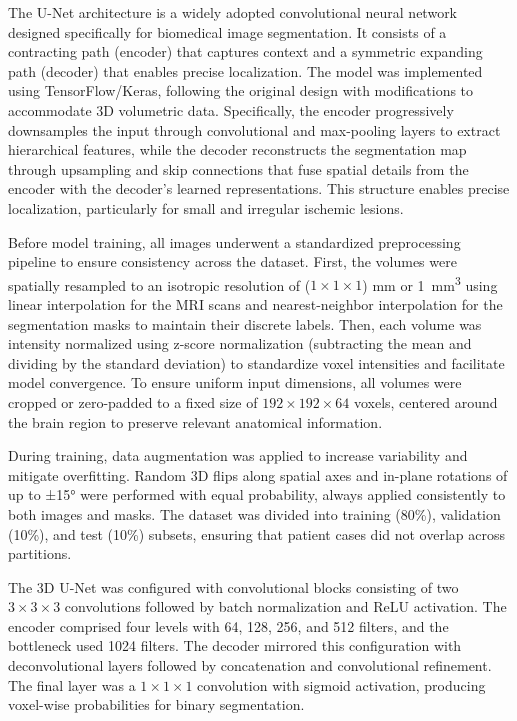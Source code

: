 \documentclass[12pt]{article}
\begin{document}
The U-Net architecture \cite{ronnebergerUNetConvolutionalNetworks2015} is a widely adopted convolutional neural network designed specifically for biomedical image segmentation. It consists of a contracting path (encoder) that captures context and a symmetric expanding path (decoder) that enables precise localization. The model was implemented using TensorFlow/Keras, following the original design with modifications to accommodate 3D volumetric data. Specifically, the encoder progressively downsamples the input through convolutional and max-pooling layers to extract hierarchical features, while the decoder reconstructs the segmentation map through upsampling and skip connections that fuse spatial details from the encoder with the decoder’s learned representations. This structure enables precise localization, particularly for small and irregular ischemic lesions.

Before model training, all images underwent a standardized preprocessing pipeline to ensure consistency across the dataset. First, the volumes were spatially resampled to an isotropic resolution of ($1 \times 1 \times 1 $) mm or \SI{1}{\milli\meter\cubed} using linear interpolation for the MRI scans and nearest-neighbor interpolation for the segmentation masks to maintain their discrete labels. Then, each volume was intensity normalized using z-score normalization (subtracting the mean and dividing by the standard deviation) to standardize voxel intensities and facilitate model convergence. To ensure uniform input dimensions, all volumes were cropped or zero-padded to a fixed size of $192 \times 192 \times 64$ voxels, centered around the brain region to preserve relevant anatomical information.

During training, data augmentation was applied to increase variability and mitigate overfitting. Random 3D flips along spatial axes and in-plane rotations of up to ±15° were performed with equal probability, always applied consistently to both images and masks. The dataset was divided into training (80\%), validation (10\%), and test (10\%) subsets, ensuring that patient cases did not overlap across partitions.

The 3D U-Net was configured with convolutional blocks consisting of two $3 \times 3 \times 3$ convolutions followed by batch normalization and ReLU activation. The encoder comprised four levels with 64, 128, 256, and 512 filters, and the bottleneck used 1024 filters. The decoder mirrored this configuration with deconvolutional layers followed by concatenation and convolutional refinement. The final layer was a  $1 \times 1 \times 1 $ convolution with sigmoid activation, producing voxel-wise probabilities for binary segmentation.
\end{document}
